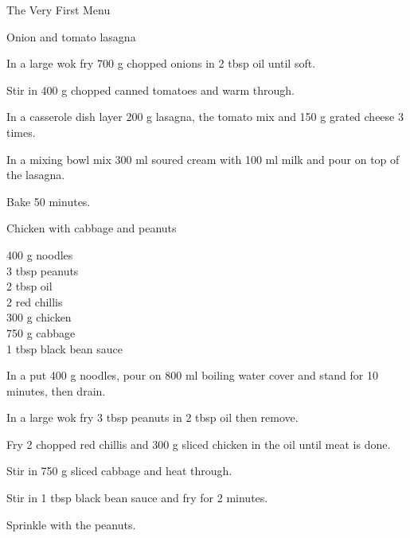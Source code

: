 \begin{menu}{The Very First Menu}
\begin{recipe}{2}{Onion and tomato lasagna}
\begin{ingredients}
		\end{ingredients}
	
    \begin{instructions}
    \item 
				In a large wok fry
				700 g chopped onions
				in
				2 tbsp  oil
				until soft.
			\item 
				Stir in 400 g chopped canned tomatoes
				and warm through.
			\item 
				In a casserole dish layer
				200 g  lasagna,
				the tomato mix and
				150 g grated cheese
				3 times.
			\item 
				In a mixing bowl mix
				300 ml  soured cream
				with
				100 ml  milk
				and pour on top of the lasagna.
			\item 
				Bake  50 minutes.
			
    \end{instructions}
    \end{recipe}%
  
    \begin{recipe}{2}{Chicken with cabbage and peanuts}%
    
		\begin{ingredients}
		400 g noodles  \\
	3 tbsp peanuts  \\
	2 tbsp oil  \\
	2  red chillis  \\
	300 g chicken  \\
	750 g cabbage  \\
	1 tbsp black bean sauce  \\
	
		\end{ingredients}
	
    \begin{instructions}
    \item 
      In a 
      put
      400 g  noodles,
      pour on
      800 ml  boiling water
      cover and stand for 10 minutes, then drain.
    \item 
				In a large wok	fry
				3 tbsp  peanuts
				in
				2 tbsp  oil
				then remove.
			\item 
				Fry 2  chopped red chillis
				and
				300 g sliced chicken
				in the oil until meat is done.
			\item 
				Stir in
				750 g sliced cabbage
				and heat through.
			\item 
				Stir in 
				1 tbsp  black bean sauce
				and fry for 2 minutes.
			\item 
				Sprinkle with the peanuts.
			

\end{instructions}
\end{recipe}
\end{menu}
